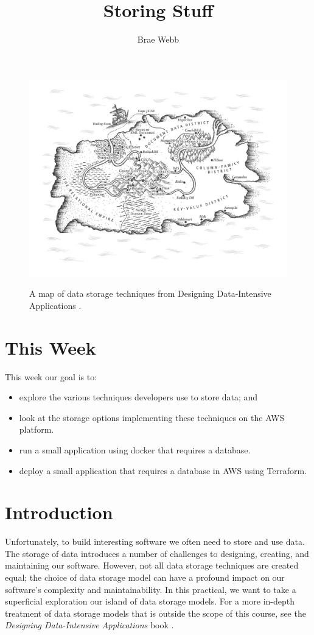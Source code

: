 \documentclass{csse4400}
\title{Storing Stuff}
\author{Brae Webb}
\date{\week{3}}
\begin{document}
\maketitle

\begin{figure}[h]
  \href{https://www.oreilly.com/library/view/designing-data-intensive-applications/9781491903063/ch02.html}{
    \includegraphics[width=\textwidth]{images/databases}
  }
\caption{A map of data storage techniques from Designing Data-Intensive Applications \cite{data-intensive}.}
\end{figure}

\section{This Week}
This week our goal is to:
\begin{itemize}
  \item explore the various techniques developers use to store data; and
  \item look at the storage options implementing these techniques on the AWS platform.
  \item run a small application using docker that requires a database.
  \item deploy a small application that requires a database in AWS using Terraform.
\end{itemize}

\section{Introduction}
Unfortunately, to build interesting software we often need to store and use data.
The storage of data introduces a number of challenges to designing, creating, and maintaining our software.
However, not all data storage techniques are created equal;
the choice of data storage model can have a profound impact on our software's complexity and maintainability.
In this practical, we want to take a superficial exploration our island of data storage models.
For a more in-depth treatment of data storage models that is outside the scope of this course,
see the \textit{Designing Data-Intensive Applications} book \cite{data-intensive}.
\end{document}
